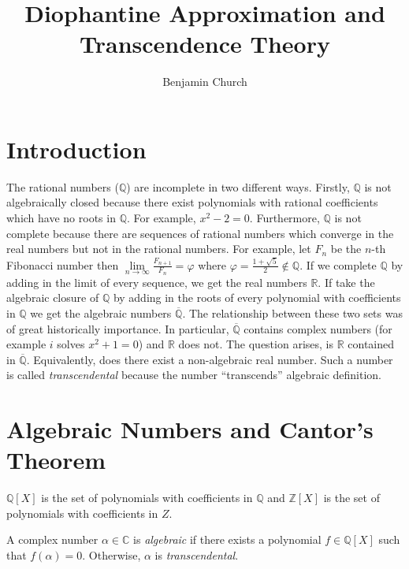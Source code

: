 \documentclass{article}
\newcommand{\Z}{\mathbb{Z}}
\newcommand{\C}{\mathbb{C}}
\newcommand{\Q}{\mathbb{Q}}
\newcommand{\R}{\mathbb{R}}
\newenvironment{definition}[1][Definition:]{\begin{trivlist}
\item[\hskip \labelsep {\bfseries #1}]}{\end{trivlist}}
\theoremstyle{theorem}
\theoremstyle{definition}
\theoremstyle{definition}
\theoremstyle{remark}
\theoremstyle{definition}
\theoremstyle{remark}
\begin{document}
\author{Benjamin Church}
\title{\Huge Diophantine Approximation and Transcendence Theory}

\maketitle
\tableofcontents
\newpage


\section{Introduction}

The rational numbers ($\Q$) are incomplete in two different ways. Firstly, $\Q$ is not algebraically closed because there exist polynomials with rational coefficients which have no roots in $\Q$. For example, $x^2 - 2 = 0$. Furthermore, $\Q$ is not complete because there are sequences of rational numbers which converge in the real numbers but not in the rational numbers. For example, let $F_n$ be the $n$-th Fibonacci number then $\lim\limits_{n \to \infty} \frac{F_{n+1}}{F_n} = \varphi$ where $\varphi = \frac{1 + \sqrt{5}}{2} \notin \Q$. If we complete $\Q$ by adding in the limit of every sequence, we get the real numbers $\R$. If take the algebraic closure of $\Q$ by adding in the roots of every polynomial with coefficients in $\Q$ we get the algebraic numbers $\overline{\Q}$. The relationship between these two sets was of great historically importance. In particular, $\overline{\Q}$ contains complex numbers (for example $i$ solves $x^2 + 1 = 0$) and $\R$ does not. The question arises, is $\R$ contained in $\overline{\Q}$. Equivalently, does there exist a non-algebraic real number. Such a number is called \textit{transcendental} because the number ``transcends'' algebraic definition.  

\section{Algebraic Numbers and Cantor's Theorem}

\begin{definition}
$\Q[X]$ is the set of polynomials with coefficients in $\Q$ and $\Z[X]$ is the set of polynomials with coefficients in $Z$.  
\end{definition}

\begin{definition}
A complex number $\alpha \in \C$ is \textit{algebraic} if there exists a polynomial $f \in \Q[X]$ such that $f(\alpha) = 0$. Otherwise, $\alpha$ is \textit{transcendental}. 
\end{definition}
\end{document}
